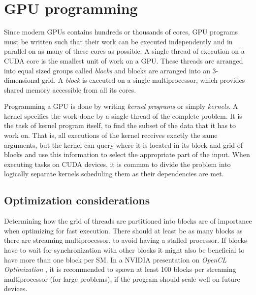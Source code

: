 \section{GPU programming}
Since modern GPUs contains hundreds or thousands of
cores, GPU programs must be written such that their work can be
executed independently and in parallel on as many of these cores as
possible. A single thread of execution on a CUDA core is the smallest
unit of work on a GPU. These threads are arranged into equal sized
groups called \textit{blocks} and blocks are arranged into an
$3$-dimensional grid. A \textit{block} is executed on a single
multiprocessor, which provides shared memory accessible from all its
cores.

Programming a GPU is done by writing \textit{kernel programs} or
simply \textit{kernels}. A kernel specifies the work done by a single
thread of the complete problem. It is the task of kernel program
itself, to find the subset of the data that it has to work on. That
is, all executions of the kernel receives exactly the same arguments,
but the kernel can query where it is located in its block and grid of
blocks and use this information to select the appropriate part of the
input. When executing tasks on CUDA devices, it is common to divide
the problem into logically separate kernels scheduling them as their
dependencies are met.




\subsection{Optimization considerations}
Determining how the grid of threads are partitioned into blocks are of
importance when optimizing for fast execution. There should at least
be as many blocks as there are streaming multiprocessor, to avoid
having a stalled processor. If blocks have to wait for synchronization
with other blocks it might also be beneficial to have more than one
block per SM. In a NVIDIA presentation on \textit{OpenCL Optimization}
\cite{nvidia2009opencloptimization}, it is recommended to spawn at
least 100 blocks per streaming multiprocessor (for large problems), if
the program should scale well on future devices.

